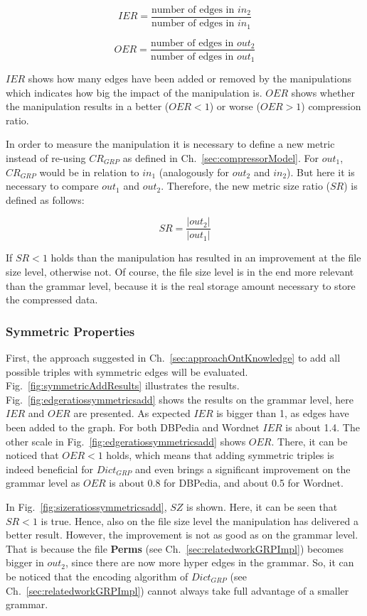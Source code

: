  \[
 IER=\frac {\text{number of edges in } in_2} {\text{number of edges in  } in_1}
 \]
 
 \[
 OER=\frac {\text{number of edges in } out_2} {\text{number of edges in } out_1}
 \]
 
$IER$ shows how many edges have been added or removed by the manipulations which indicates how big the impact of the manipulation is. $OER$  shows whether the manipulation results in a better ($OER<1$) or worse ($OER>1$) compression ratio.

In order to measure the manipulation it is necessary to define a new metric instead of re-using $CR_{GRP}$ as defined in Ch.~\ref{sec:compressorModel}. For $out_1$, $CR_{GRP}$ would be in relation to $in_1$ (analogously for $out_2$ and $in_2$). But here it is necessary to compare $out_1$ and $out_2$. Therefore, the new metric size ratio ($SR$) is defined as follows:

 \[
SR=\frac {|out_2|} {|out_1|}
\]

If $SR<1$ holds than the manipulation has resulted in an improvement at the file size level, otherwise not. Of course, the file size level is in the end more relevant than the grammar level, because it is the real storage amount necessary to store the compressed data.



\subsubsection{Symmetric Properties}

First, the approach suggested in Ch.~\ref{sec:approachOntKnowledge} to add all possible triples with symmetric edges will be evaluated. Fig.~\ref{fig:symmetricAddResults} illustrates the results. Fig.~\ref{fig:edgeratiossymmetricsadd} shows the results on the grammar level, here $IER$ and $OER$ are presented. As expected $IER$ is bigger than 1, as edges have been added to the graph. For both DBPedia and Wordnet $IER$ is about 1.4. The other scale in Fig.~\ref{fig:edgeratiossymmetricsadd} shows $OER$. There, it can be noticed that $OER<1$ holds, which means that adding symmetric triples is indeed beneficial for $Dict_{GRP}$ and even brings a significant improvement on the grammar level as $OER$ is about 0.8 for DBPedia, and about 0.5 for Wordnet.

In Fig.~\ref{fig:sizeratiossymmetricsadd}, $SZ$ is shown. Here, it can be seen that $SR<1$ is true. Hence, also on the file size level the manipulation has delivered a better result. However, the improvement is not as good as on the grammar level. That is because the file \textbf{Perms} (see Ch.~\ref{sec:relatedworkGRPImpl}) becomes bigger in $out_2$, since there are now more hyper edges in the grammar. So, it can be noticed that the encoding algorithm of $Dict_{GRP}$ (see Ch.~\ref{sec:relatedworkGRPImpl}) cannot always take full advantage of a smaller grammar.

